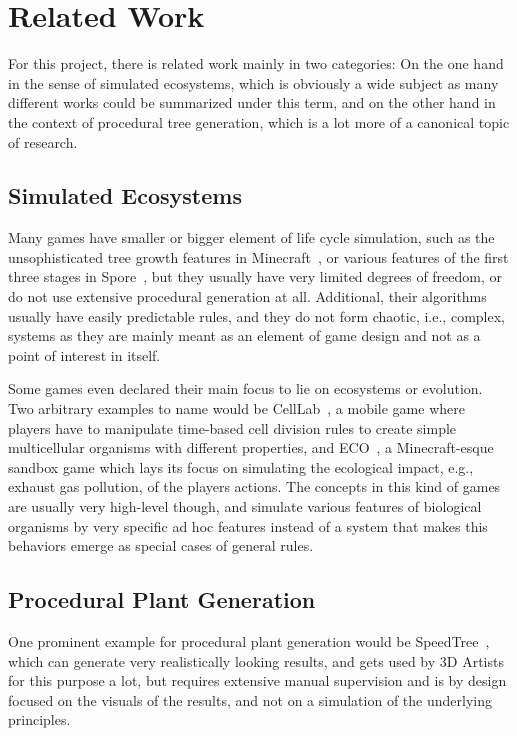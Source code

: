 \documentclass[11pt, abstract=on]{scrartcl}
\begin{document}
\section{Related Work}

For this project, there is related work mainly in two categories: On the one hand in the sense of simulated ecosystems, which is obviously a wide subject as many different works could be summarized under this term, and on the other hand in the context of procedural tree generation, which is a lot more of a canonical topic of research.

\subsection{Simulated Ecosystems}

Many games have smaller or bigger element of life cycle simulation, such as the unsophisticated tree growth features in Minecraft~\cite{MinecraftTree}, or various features of the first three stages in Spore~\cite{Spore}, but they usually have very limited degrees of freedom, or do not use extensive procedural generation at all. Additional, their algorithms usually have easily predictable rules, and they do not form chaotic, i.e., complex, systems as they are mainly meant as an element of game design and not as a point of interest in itself.

Some games even declared their main focus to lie on ecosystems or evolution. Two arbitrary examples to name would be CellLab~\cite{CellLab}, a mobile game where players have to manipulate time-based cell division rules to create simple multicellular organisms with different properties, and ECO~\cite{EcoGame}, a Minecraft-esque sandbox game which lays its focus on simulating the ecological impact, e.g., exhaust gas pollution, of the players actions. The concepts in this kind of games are usually very high-level though, and simulate various features of biological organisms by very specific ad hoc features instead of a system that makes this behaviors emerge as special cases of general rules.

\subsection{Procedural Plant Generation}
One prominent example for procedural plant generation would be SpeedTree~\cite{SpeedTree}, which can generate very realistically looking results, and gets used by 3D Artists for this purpose a lot, but requires extensive manual supervision and is by design focused on the visuals of the results, and not on a simulation of the underlying principles. 
\end{document}
